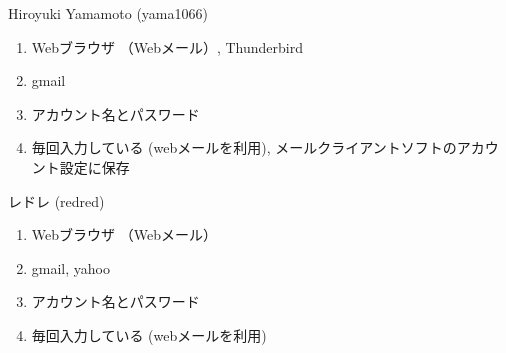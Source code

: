 \begin{prework}{ Hiroyuki Yamamoto (yama1066) }
  \begin{enumerate}
  \item Webブラウザ （Webメール）, Thunderbird
  \item gmail
  \item アカウント名とパスワード
  \item 毎回入力している (webメールを利用), メールクライアントソフトのアカウント設定に保存
  \end{enumerate}
\end{prework}

\begin{prework}{ レドレ (redred) }
  \begin{enumerate}
  \item Webブラウザ （Webメール）
  \item gmail, yahoo
  \item アカウント名とパスワード
  \item 毎回入力している (webメールを利用)
  \end{enumerate}
\end{prework}
